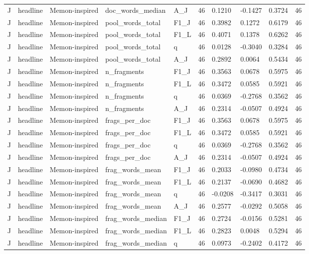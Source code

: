 \begin{table}[t]
{\begin{tabular}{llllllllll}
J & headline & Memon-inspired & doc\_words\_median & A\_J & 46 & 0.1210 & -0.1427 & 0.3724 & 46 \\
J & headline & Memon-inspired & pool\_words\_total & F1\_J & 46 & 0.3982 & 0.1272 & 0.6179 & 46 \\
J & headline & Memon-inspired & pool\_words\_total & F1\_L & 46 & 0.4071 & 0.1378 & 0.6262 & 46 \\
J & headline & Memon-inspired & pool\_words\_total & q & 46 & 0.0128 & -0.3040 & 0.3284 & 46 \\
J & headline & Memon-inspired & pool\_words\_total & A\_J & 46 & 0.2892 & 0.0064 & 0.5434 & 46 \\
J & headline & Memon-inspired & n\_fragments & F1\_J & 46 & 0.3563 & 0.0678 & 0.5975 & 46 \\
J & headline & Memon-inspired & n\_fragments & F1\_L & 46 & 0.3472 & 0.0585 & 0.5921 & 46 \\
J & headline & Memon-inspired & n\_fragments & q & 46 & 0.0369 & -0.2768 & 0.3562 & 46 \\
J & headline & Memon-inspired & n\_fragments & A\_J & 46 & 0.2314 & -0.0507 & 0.4924 & 46 \\
J & headline & Memon-inspired & frags\_per\_doc & F1\_J & 46 & 0.3563 & 0.0678 & 0.5975 & 46 \\
J & headline & Memon-inspired & frags\_per\_doc & F1\_L & 46 & 0.3472 & 0.0585 & 0.5921 & 46 \\
J & headline & Memon-inspired & frags\_per\_doc & q & 46 & 0.0369 & -0.2768 & 0.3562 & 46 \\
J & headline & Memon-inspired & frags\_per\_doc & A\_J & 46 & 0.2314 & -0.0507 & 0.4924 & 46 \\
J & headline & Memon-inspired & frag\_words\_mean & F1\_J & 46 & 0.2033 & -0.0980 & 0.4734 & 46 \\
J & headline & Memon-inspired & frag\_words\_mean & F1\_L & 46 & 0.2137 & -0.0690 & 0.4682 & 46 \\
J & headline & Memon-inspired & frag\_words\_mean & q & 46 & -0.0208 & -0.3417 & 0.3031 & 46 \\
J & headline & Memon-inspired & frag\_words\_mean & A\_J & 46 & 0.2577 & -0.0292 & 0.5058 & 46 \\
J & headline & Memon-inspired & frag\_words\_median & F1\_J & 46 & 0.2724 & -0.0156 & 0.5281 & 46 \\
J & headline & Memon-inspired & frag\_words\_median & F1\_L & 46 & 0.2823 & 0.0048 & 0.5294 & 46 \\
J & headline & Memon-inspired & frag\_words\_median & q & 46 & 0.0973 & -0.2402 & 0.4172 & 46 \\

\end{tabular}}
\end{table}
